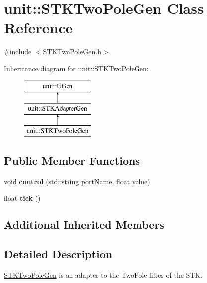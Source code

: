 \hypertarget{classunit_1_1STKTwoPoleGen}{\section{unit\-:\-:S\-T\-K\-Two\-Pole\-Gen Class Reference}
\label{classunit_1_1STKTwoPoleGen}
}


{\ttfamily \#include $<$S\-T\-K\-Two\-Pole\-Gen.\-h$>$}

Inheritance diagram for unit\-:\-:S\-T\-K\-Two\-Pole\-Gen\-:\begin{figure}[H]
\begin{center}
\leavevmode
\includegraphics[height=3.000000cm]{classunit_1_1STKTwoPoleGen}
\end{center}
\end{figure}
\subsection*{Public Member Functions}
\begin{DoxyCompactItemize}
\item 
\hypertarget{classunit_1_1STKTwoPoleGen_a71b904b3c03c69f5fb25bbf2449fb802}{void {\bfseries control} (std\-::string port\-Name, float value)}\label{classunit_1_1STKTwoPoleGen_a71b904b3c03c69f5fb25bbf2449fb802}

\item 
\hypertarget{classunit_1_1STKTwoPoleGen_ade033932ab7e85b7f3d6a69461eef372}{float {\bfseries tick} ()}\label{classunit_1_1STKTwoPoleGen_ade033932ab7e85b7f3d6a69461eef372}

\end{DoxyCompactItemize}
\subsection*{Additional Inherited Members}


\subsection{Detailed Description}
\hyperlink{classunit_1_1STKTwoPoleGen}{S\-T\-K\-Two\-Pole\-Gen} is an adapter to the Two\-Pole filter of the S\-T\-K.

